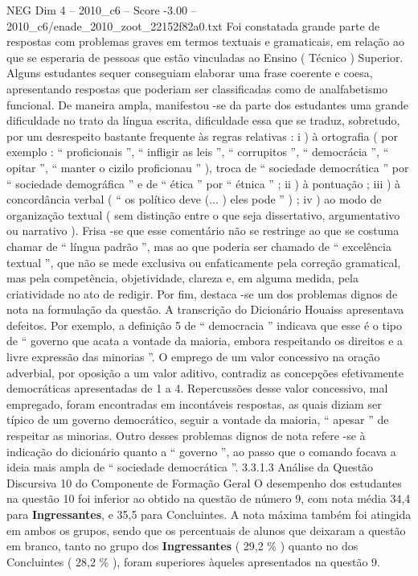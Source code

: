 \begin{textsample}{NEG Dim 4 – 2010\_c6 – Score -3.00 – 2010\_c6/enade\_2010\_zoot\_22152f82a0.txt}
Foi constatada grande parte de respostas com problemas graves em termos textuais e gramaticais, em relação ao que se esperaria de pessoas que estão vinculadas ao Ensino ( Técnico ) Superior.
Alguns estudantes sequer conseguiam elaborar uma frase coerente e coesa, apresentando respostas que poderiam ser classificadas como de analfabetismo funcional.
De maneira ampla, manifestou -se da parte dos estudantes uma grande dificuldade no trato da língua escrita, dificuldade essa que se traduz, sobretudo, por um desrespeito bastante frequente às regras relativas : i ) à ortografia ( por exemplo : “ proficionais ”, “ infligir as leis ”, “ corrupitos ”, “ democrácia ”, “ opitar ”, “ manter o cizilo proficionau ” ), troca de “ sociedade democrática ” por “ sociedade demográfica ” e de “ ética ” por “ étnica ” ; ii ) à pontuação ; iii ) à concordância verbal ( “ os político deve (... ) eles pode ” ) ; iv ) ao modo de organização textual ( sem distinção entre o que seja dissertativo, argumentativo ou narrativo ).
Frisa -se que esse comentário não se restringe ao que se costuma chamar de “ língua padrão ”, mas ao que poderia ser chamado de “ excelência textual ”, que não se mede exclusiva ou enfaticamente pela correção gramatical, mas pela competência, objetividade, clareza e, em alguma medida, pela criatividade no ato de redigir.
Por fim, destaca -se um dos problemas dignos de nota na formulação da questão.
A transcrição do Dicionário Houaiss apresentava defeitos.
Por exemplo, a definição 5 de “ democracia ” indicava que esse é o tipo de “ governo que acata a vontade da maioria, embora respeitando os direitos e a livre expressão das minorias ”.
O emprego de um valor concessivo na oração adverbial, por oposição a um valor aditivo, contradiz as concepções efetivamente democráticas apresentadas de 1 a 4.
Repercussões desse valor concessivo, mal empregado, foram encontradas em incontáveis respostas, as quais diziam ser típico de um governo democrático, seguir a vontade da maioria, “ apesar ” de respeitar as minorias.
Outro desses problemas dignos de nota refere -se à indicação do dicionário quanto a “ governo ”, ao passo que o comando focava a ideia mais ampla de “ sociedade democrática ”. 3.3.1.3 Análise da Questão Discursiva 10 do Componente de Formação Geral O desempenho dos estudantes na questão 10 foi inferior ao obtido na questão de número 9, com nota média 34,4 para \textbf{Ingressantes}, e 35,5 para Concluintes.
A nota máxima também foi atingida em ambos os grupos, sendo que os percentuais de alunos que deixaram a questão em branco, tanto no grupo dos \textbf{Ingressantes} ( 29,2 \% ) quanto no dos Concluintes ( 28,2 \% ), foram superiores àqueles apresentados na questão 9.

\end{textsample}
